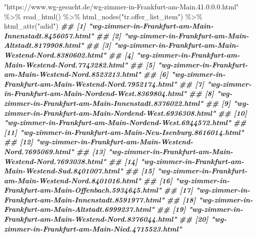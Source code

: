 \documentclass[
  ngerman,
]{article}
\newenvironment{Shaded}{\begin{snugshade}}{\end{snugshade}}
\newcommand{\DocumentationTok}[1]{\textcolor[rgb]{0.56,0.35,0.01}{\textbf{\textit{#1}}}}
\newcommand{\FunctionTok}[1]{\textcolor[rgb]{0.00,0.00,0.00}{#1}}
\newcommand{\NormalTok}[1]{#1}
\newcommand{\SpecialCharTok}[1]{\textcolor[rgb]{0.00,0.00,0.00}{#1}}
\newcommand{\StringTok}[1]{\textcolor[rgb]{0.31,0.60,0.02}{#1}}
\begin{document}
\begin{Shaded}
\begin{Highlighting}[]
\StringTok{"https://www.wg{-}gesucht.de/wg{-}zimmer{-}in{-}Frankfurt{-}am{-}Main.41.0.0.0.html"} \SpecialCharTok{\%\textgreater{}\%}
  \FunctionTok{read\_html}\NormalTok{() }\SpecialCharTok{\%\textgreater{}\%}
  \FunctionTok{html\_nodes}\NormalTok{(}\StringTok{"tr.offer\_list\_item"}\NormalTok{) }\SpecialCharTok{\%\textgreater{}\%}
  \FunctionTok{html\_attr}\NormalTok{(}\StringTok{"adid"}\NormalTok{)}
\DocumentationTok{\#\#  [1] "wg{-}zimmer{-}in{-}Frankfurt{-}am{-}Main{-}Innenstadt.8456057.html"  }
\DocumentationTok{\#\#  [2] "wg{-}zimmer{-}in{-}Frankfurt{-}am{-}Main{-}Altstadt.8179908.html"    }
\DocumentationTok{\#\#  [3] "wg{-}zimmer{-}in{-}Frankfurt{-}am{-}Main{-}Westend{-}Nord.8380602.html"}
\DocumentationTok{\#\#  [4] "wg{-}zimmer{-}in{-}Frankfurt{-}am{-}Main{-}Westend{-}Nord.7743282.html"}
\DocumentationTok{\#\#  [5] "wg{-}zimmer{-}in{-}Frankfurt{-}am{-}Main{-}Westend{-}Nord.8523213.html"}
\DocumentationTok{\#\#  [6] "wg{-}zimmer{-}in{-}Frankfurt{-}am{-}Main{-}Westend{-}Nord.7952174.html"}
\DocumentationTok{\#\#  [7] "wg{-}zimmer{-}in{-}Frankfurt{-}am{-}Main{-}Nordend{-}West.8369804.html"}
\DocumentationTok{\#\#  [8] "wg{-}zimmer{-}in{-}Frankfurt{-}am{-}Main{-}Innenstadt.8376022.html"  }
\DocumentationTok{\#\#  [9] "wg{-}zimmer{-}in{-}Frankfurt{-}am{-}Main{-}Nordend{-}West.6936308.html"}
\DocumentationTok{\#\# [10] "wg{-}zimmer{-}in{-}Frankfurt{-}am{-}Main{-}Nordend{-}West.6944572.html"}
\DocumentationTok{\#\# [11] "wg{-}zimmer{-}in{-}Frankfurt{-}am{-}Main{-}Neu{-}Isenburg.8616014.html"}
\DocumentationTok{\#\# [12] "wg{-}zimmer{-}in{-}Frankfurt{-}am{-}Main{-}Westend{-}Nord.7695069.html"}
\DocumentationTok{\#\# [13] "wg{-}zimmer{-}in{-}Frankfurt{-}am{-}Main{-}Westend{-}Nord.7693038.html"}
\DocumentationTok{\#\# [14] "wg{-}zimmer{-}in{-}Frankfurt{-}am{-}Main{-}Westend{-}Sud.8401007.html" }
\DocumentationTok{\#\# [15] "wg{-}zimmer{-}in{-}Frankfurt{-}am{-}Main{-}Westend{-}Nord.8401016.html"}
\DocumentationTok{\#\# [16] "wg{-}zimmer{-}in{-}Frankfurt{-}am{-}Main{-}Offenbach.5934645.html"   }
\DocumentationTok{\#\# [17] "wg{-}zimmer{-}in{-}Frankfurt{-}am{-}Main{-}Innenstadt.8591977.html"  }
\DocumentationTok{\#\# [18] "wg{-}zimmer{-}in{-}Frankfurt{-}am{-}Main{-}Altstadt.6999237.html"    }
\DocumentationTok{\#\# [19] "wg{-}zimmer{-}in{-}Frankfurt{-}am{-}Main{-}Westend{-}Nord.8376044.html"}
\DocumentationTok{\#\# [20] "wg{-}zimmer{-}in{-}Frankfurt{-}am{-}Main{-}Nied.4715523.html"}
\end{Highlighting}
\end{Shaded}
\end{document}
